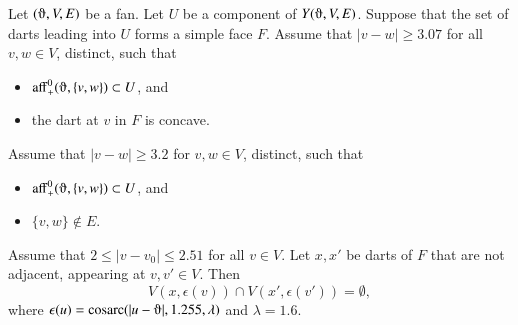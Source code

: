%
%
%
%
%
%
%


\begin{lemma}
Let $(\orgn,V,E)$ be a fan.  Let $U$ be a component of $Y(\orgn,V,E)$.
Suppose that the set of darts leading into $U$ forms a simple face $F$.
Assume that $|v-w|\ge 3.07$ for all $v,w\in V$, distinct, such that
  \begin{itemize}
   \item $\op{aff}_+^0(\orgn,\{v,w\})\subset U$, and
   \item the dart at $v$ in $F$ is concave.
  \end{itemize}
Assume that $|v-w|\ge 3.2$ for $v,w\in V$, distinct, such that
  \begin{itemize}
   \item $\op{aff}_+^0(\orgn,\{v,w\})\subset U$, and
   \item $\{v,w\}\not\in E$.  %
  \end{itemize}
Assume that $2\le |v-v_0|\le 2.51$ for all $v\in V$.
Let $x,x'$ be darts of $F$ that are not adjacent, appearing at $v,v'\in V$.  
Then
$$
V(x,\epsilon(v))\cap V(x',\epsilon(v')) = \emptyset,
$$
where $\epsilon(u) = \cosarc(|u-\orgn|,1.255,\lambda)$ and $\lambda=1.6$.
\end{lemma}


